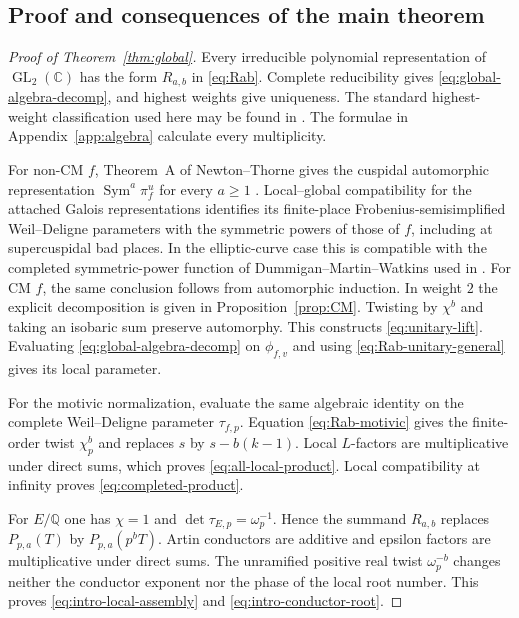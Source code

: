 \documentclass[11pt,reqno]{amsart}
\theoremstyle{definition}
\theoremstyle{remark}
\newcommand{\C}{\mathbb C}
\newcommand{\Q}{\mathbb Q}
\newcommand{\GL}{\operatorname{GL}}
\newcommand{\Sym}{\operatorname{Sym}}
\begin{document}
\subsection{Proof and consequences of the main theorem}

\begin{proof}[Proof of Theorem~\ref{thm:global}]
Every irreducible polynomial representation of $\GL_2(\C)$ has the form
$R_{a,b}$ in \eqref{eq:Rab}.  Complete reducibility gives
\eqref{eq:global-algebra-decomp}, and highest weights give uniqueness.  The
standard highest-weight classification used here may be found in
\cite[Sections~6.1--6.2]{FultonHarris}.  The formulae in
Appendix~\ref{app:algebra} calculate every multiplicity.

For non-CM $f$, Theorem~A of Newton--Thorne gives the cuspidal automorphic
representation $\Sym^a\pi_f^u$ for every $a\geq1$
\cite[Theorem~A]{NewtonThorne2021b}.  Local--global compatibility for the
attached Galois representations identifies its finite-place
Frobenius-semisimplified Weil--Deligne parameters with the symmetric powers of those of
$f$, including at supercuspidal bad places.  In the elliptic-curve case this
is compatible with the completed symmetric-power function of Dummigan--Martin--Watkins used in
\cite[Corollary~B]{NewtonThorne2021b}.  For CM $f$,
the same conclusion follows from automorphic induction.  In weight $2$ the
explicit decomposition is given in Proposition~\ref{prop:CM}.  Twisting by
$\chi^b$ and taking an isobaric sum preserve automorphy.  This constructs
\eqref{eq:unitary-lift}.  Evaluating
\eqref{eq:global-algebra-decomp} on $\phi_{f,v}$ and using
\eqref{eq:Rab-unitary-general} gives its local parameter.

For the motivic normalization, evaluate the same algebraic identity on the
complete Weil--Deligne parameter $\tau_{f,p}$.  Equation
\eqref{eq:Rab-motivic} gives the finite-order twist $\chi_p^b$ and replaces
$s$ by $s-b(k-1)$.  Local $L$-factors are multiplicative under direct sums,
which proves \eqref{eq:all-local-product}.  Local compatibility at infinity
proves \eqref{eq:completed-product}.

For $E/\Q$ one has $\chi=1$ and
$\det\tau_{E,p}=\omega_p^{-1}$.  Hence the summand $R_{a,b}$ replaces
$P_{p,a}(T)$ by $P_{p,a}(p^bT)$.  Artin conductors are additive and epsilon
factors are multiplicative under direct sums.  The unramified positive real
twist $\omega_p^{-b}$ changes neither the conductor exponent nor the phase of
the local root number.  This proves \eqref{eq:intro-local-assembly} and
\eqref{eq:intro-conductor-root}.
\end{proof}
\end{document}
